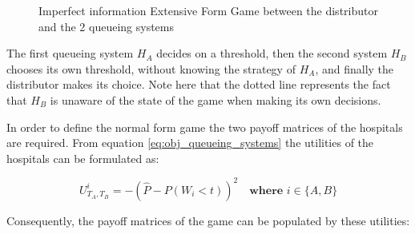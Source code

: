\begin{figure}[ht]
    \centering
    \caption{Imperfect information Extensive Form Game between the distributor 
    and the 2 queueing systems}
    \label{fig:imperfect_info_game}
\end{figure}

The first 
queueing system \(H_A\) decides on a threshold, then the second system \(H_B\)
chooses its own threshold, without knowing the strategy of \(H_A\), and finally
the distributor makes its choice. Note here that the dotted line represents the
fact that \(H_B\) is unaware of the state of the game when making its own 
decisions. 

In order to define the normal form game the two payoff matrices of the hospitals 
are required. From equation \ref{eq:obj_queueing_systems} the utilities of the
hospitals can be formulated as:

\begin{equation} \label{eq:payoff_entry}
    U_{T_A, T_B}^i = -\left( 
        \hat{P} - P(W_i < t) 
    \right)^2 \quad \textbf{where } i \in \{A, B\}
\end{equation}

Consequently, the payoff matrices of the game can be populated by these 
utilities:

